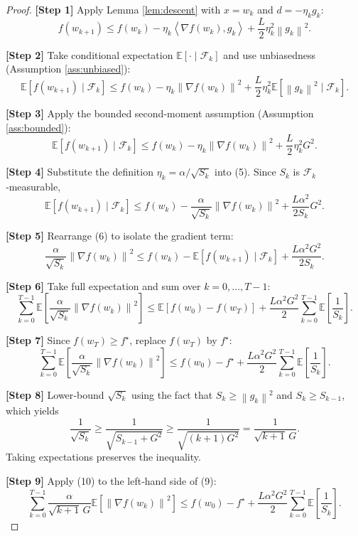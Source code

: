 \documentclass[11pt]{article}
\newcommand{\EE}{\mathbb{E}}
\newcommand{\norm}[1]{\left\|#1\right\|}
\newcommand{\inner}[2]{\left\langle #1,#2 \right\rangle}
\begin{document}
\begin{proof}
\textbf{[Step 1]} Apply Lemma \ref{lem:descent} with $x=w_k$ and $d=-\eta_k g_k$:
\[
f(w_{k+1})\le f(w_k)-\eta_k\inner{\nabla f(w_k)}{g_k}+\frac{L}{2}\eta_k^2\norm{g_k}^2 .
\tag{3}
\]

\textbf{[Step 2]} Take conditional expectation $\EE[\cdot\mid\mathcal{F}_k]$ and use unbiasedness (Assumption \ref{ass:unbiased}):
\[
\EE\!\left[f(w_{k+1})\mid\mathcal{F}_k\right]
\le f(w_k)-\eta_k\norm{\nabla f(w_k)}^2
+\frac{L}{2}\eta_k^2\EE\!\left[\norm{g_k}^2\mid\mathcal{F}_k\right].
\tag{4}
\]

\textbf{[Step 3]} Apply the bounded second‑moment assumption (Assumption \ref{ass:bounded}):
\[
\EE\!\left[f(w_{k+1})\mid\mathcal{F}_k\right]
\le f(w_k)-\eta_k\norm{\nabla f(w_k)}^2
+\frac{L}{2}\eta_k^2 G^2 .
\tag{5}
\]

\textbf{[Step 4]} Substitute the definition $\eta_k=\alpha/\sqrt{S_k}$ into (5). Since $S_k$ is $\mathcal{F}_k$‑measurable,
\[
\EE\!\left[f(w_{k+1})\mid\mathcal{F}_k\right]
\le f(w_k)-\frac{\alpha}{\sqrt{S_k}}\norm{\nabla f(w_k)}^2
+\frac{L\alpha^2}{2S_k} G^2 .
\tag{6}
\]

\textbf{[Step 5]} Rearrange (6) to isolate the gradient term:
\[
\frac{\alpha}{\sqrt{S_k}}\norm{\nabla f(w_k)}^2
\le f(w_k)-\EE\!\left[f(w_{k+1})\mid\mathcal{F}_k\right]
+\frac{L\alpha^2 G^2}{2S_k}.
\tag{7}
\]

\textbf{[Step 6]} Take full expectation and sum over $k=0,\dots,T-1$:
\[
\sum_{k=0}^{T-1}\EE\!\left[\frac{\alpha}{\sqrt{S_k}}\norm{\nabla f(w_k)}^2\right]
\le \EE\!\left[f(w_0)-f(w_T)\right]
+\frac{L\alpha^2 G^2}{2}\sum_{k=0}^{T-1}\EE\!\left[\frac{1}{S_k}\right].
\tag{8}
\]

\textbf{[Step 7]} Since $f(w_T)\ge f^\star$, replace $f(w_T)$ by $f^\star$:
\[
\sum_{k=0}^{T-1}\EE\!\left[\frac{\alpha}{\sqrt{S_k}}\norm{\nabla f(w_k)}^2\right]
\le f(w_0)-f^\star
+\frac{L\alpha^2 G^2}{2}\sum_{k=0}^{T-1}\EE\!\left[\frac{1}{S_k}\right].
\tag{9}
\]

\textbf{[Step 8]} Lower‑bound $\sqrt{S_k}$ using the fact that $S_k\ge \norm{g_k}^2$ and $S_k\ge S_{k-1}$, which yields
\[
\frac{1}{\sqrt{S_k}}\ge\frac{1}{\sqrt{S_{k-1}+G^2}}
\ge\frac{1}{\sqrt{(k+1)G^2}}=\frac{1}{\sqrt{k+1}\,G}.
\tag{10}
\]
Taking expectations preserves the inequality.

\textbf{[Step 9]} Apply (10) to the left‑hand side of (9):
\[
\sum_{k=0}^{T-1}\frac{\alpha}{\sqrt{k+1}\,G}\EE\!\left[\norm{\nabla f(w_k)}^2\right]
\le f(w_0)-f^\star
+\frac{L\alpha^2 G^2}{2}\sum_{k=0}^{T-1}\EE\!\left[\frac{1}{S_k}\right].
\tag{11}
\]


\end{proof}
\end{document}
